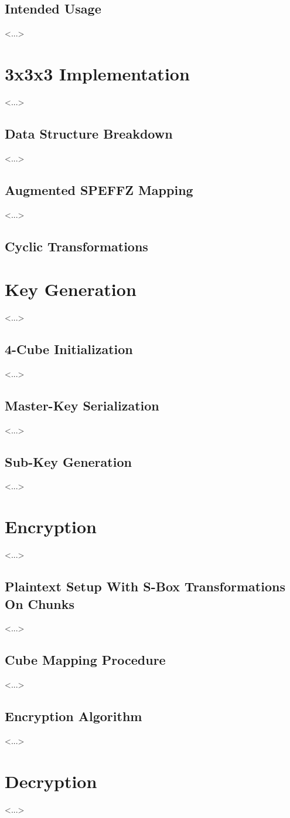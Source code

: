 \documentclass[12pt]{article}
\begin{document}
\subsection{Intended Usage}
<...>

\section{3x3x3 Implementation}
<...>

\subsection{Data Structure Breakdown}
<...>

\subsection{Augmented SPEFFZ Mapping}
<...>

\subsection{Cyclic Transformations}

\section{Key Generation}
<...>

\subsection{4-Cube Initialization}
<...>

\subsection{Master-Key Serialization}
<...>

\subsection{Sub-Key Generation}
<...>

\section{Encryption}
<...>

\subsection{Plaintext Setup With S-Box Transformations On Chunks}
<...>

\subsection{Cube Mapping Procedure}
<...>

\subsection{Encryption Algorithm}
<...>

\section{Decryption}
<...>
\end{document}
